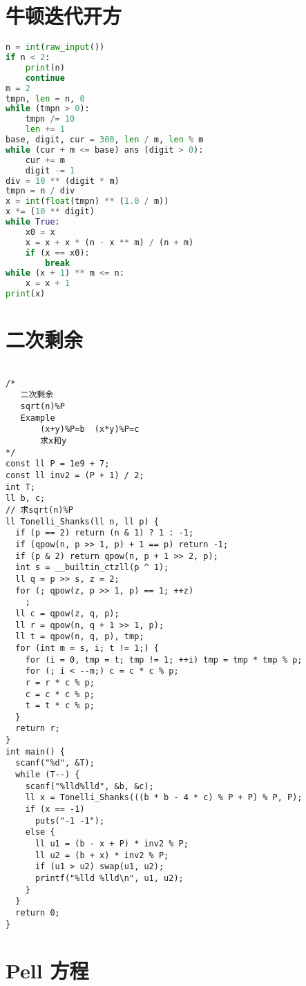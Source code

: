 \section{牛顿迭代开方}

\begin{lstlisting}[language=python]
n = int(raw_input())
if n < 2:
    print(n)
    continue
m = 2
tmpn, len = n, 0
while (tmpn > 0):
    tmpn /= 10
    len += 1
base, digit, cur = 300, len / m, len % m
while (cur + m <= base) ans (digit > 0):
    cur += m
    digit -= 1
div = 10 ** (digit * m)
tmpn = n / div
x = int(float(tmpn) ** (1.0 / m))
x *= (10 ** digit)
while True:
    x0 = x
    x = x + x * (n - x ** m) / (n + m)
    if (x == x0):
        break
while (x + 1) ** m <= n:
    x = x + 1
print(x)
\end{lstlisting}

\section{二次剩余}

\begin{lstlisting}

/*
   二次剩余
   sqrt(n)%P
   Example
       (x+y)%P=b  (x*y)%P=c
       求x和y
*/
const ll P = 1e9 + 7;
const ll inv2 = (P + 1) / 2;
int T;
ll b, c;
// 求sqrt(n)%P
ll Tonelli_Shanks(ll n, ll p) {
  if (p == 2) return (n & 1) ? 1 : -1;
  if (qpow(n, p >> 1, p) + 1 == p) return -1;
  if (p & 2) return qpow(n, p + 1 >> 2, p);
  int s = __builtin_ctzll(p ^ 1);
  ll q = p >> s, z = 2;
  for (; qpow(z, p >> 1, p) == 1; ++z)
    ;
  ll c = qpow(z, q, p);
  ll r = qpow(n, q + 1 >> 1, p);
  ll t = qpow(n, q, p), tmp;
  for (int m = s, i; t != 1;) {
    for (i = 0, tmp = t; tmp != 1; ++i) tmp = tmp * tmp % p;
    for (; i < --m;) c = c * c % p;
    r = r * c % p;
    c = c * c % p;
    t = t * c % p;
  }
  return r;
}
int main() {
  scanf("%d", &T);
  while (T--) {
    scanf("%lld%lld", &b, &c);
    ll x = Tonelli_Shanks(((b * b - 4 * c) % P + P) % P, P);
    if (x == -1)
      puts("-1 -1");
    else {
      ll u1 = (b - x + P) * inv2 % P;
      ll u2 = (b + x) * inv2 % P;
      if (u1 > u2) swap(u1, u2);
      printf("%lld %lld\n", u1, u2);
    }
  }
  return 0;
}

\end{lstlisting}

\section{Pell 方程}

